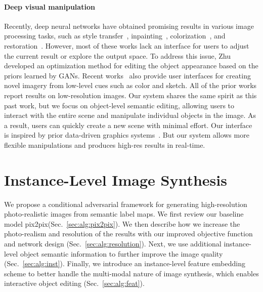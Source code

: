 \documentclass[10pt,twocolumn,letterpaper]{article}
\newcommand{\refsec}[1]{Sec.~\ref{sec:#1}}
\newcommand{\lblsec}[1]{\label{sec:#1}}
\newcommand{\pp}{pix2pix\xspace}
\begin{document}
\paragraph{Deep visual manipulation}
Recently, deep neural networks have obtained promising results in various image processing tasks, such as style transfer~\cite{gatys2016image}, inpainting~\cite{pathak2016context}, colorization~\cite{zhang2016colorful}, and restoration~\cite{gharbi2016deep}. However, most of these works lack an interface for users to adjust the current result or explore the output space. 
To address this issue, Zhu~\etal~\cite{zhu2016generative} developed an optimization method for editing the object appearance based on the priors learned by GANs. Recent works~\cite{isola2016image,sangkloy2016scribbler,zhang2017real} also provide user interfaces for creating novel imagery from low-level cues such as color and sketch. All of the prior works report results on low-resolution images. Our system shares the same spirit as this past work, but we focus on object-level semantic editing, allowing users to interact with the entire scene and manipulate individual objects in the image. As a result, users can quickly create a new scene with minimal effort. Our interface is inspired by prior data-driven graphics systems~\cite{johnson2006semantic,lalonde2007photo,chen2009sketch2photo}. But our system allows more flexible manipulations and produces high-res results in real-time.  \section{Instance-Level Image Synthesis}
\lblsec{alg}
We propose a conditional adversarial framework for generating high-resolution photo-realistic images from semantic label maps. We first review our baseline model \pp (\refsec{alg:pix2pix}). We then describe how we increase the photo-realism and resolution of the results with our improved objective function and network design (\refsec{alg:resolution}). Next, we use additional instance-level object semantic information to further improve the image quality (\refsec{alg:inst}). Finally, we introduce an instance-level feature embedding scheme to better handle the multi-modal nature of image synthesis, which enables interactive object editing (\refsec{alg:feat}).
\end{document}
